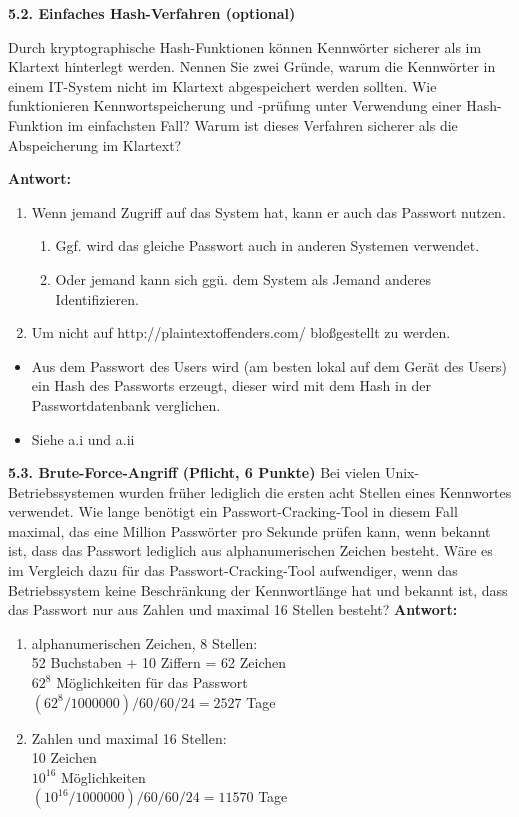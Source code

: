 \documentclass[ngerman]{fbi-aufgabenblatt}
\begin{document}
\textbf{5.2. Einfaches Hash-Verfahren (optional)}

Durch kryptographische Hash-Funktionen können Kennwörter sicherer als im Klartext hinterlegt werden. Nennen Sie zwei Gründe, warum die Kennwörter in einem IT-System nicht im Klartext abgespeichert werden sollten. Wie funktionieren Kennwortspeicherung und -prüfung unter Verwendung einer Hash-Funktion im einfachsten Fall? Warum ist dieses Verfahren sicherer als die Abspeicherung im Klartext?

\textbf{Antwort:}
   \begin{enumerate}
    \item Wenn jemand Zugriff auf das System hat, kann er auch das Passwort nutzen. 
    \begin{enumerate}
    \item Ggf. wird das gleiche Passwort auch in anderen Systemen verwendet.
    \item Oder jemand kann sich ggü. dem System als Jemand anderes Identifizieren.
    \end{enumerate}
    \item Um nicht auf http://plaintextoffenders.com/ bloßgestellt zu werden.
    \end{enumerate} 
    
    \begin{itemize}
    \item Aus dem Passwort des Users wird (am besten lokal auf dem Gerät des Users) ein Hash des Passworts erzeugt, dieser wird mit dem Hash in der Passwortdatenbank verglichen.
    \item Siehe a.i und a.ii
    \end{itemize}

\textbf{5.3. Brute-Force-Angriff (Pflicht, 6 Punkte)}
Bei vielen Unix-Betriebssystemen wurden früher lediglich die ersten acht Stellen eines Kennwortes verwendet. Wie lange benötigt ein Passwort-Cracking-Tool in diesem Fall maximal, das eine Million Passwörter pro Sekunde prüfen kann, wenn bekannt ist, dass das Passwort lediglich aus alphanumerischen Zeichen besteht. Wäre es im Vergleich dazu für das Passwort-Cracking-Tool aufwendiger, wenn das Betriebssystem keine Beschränkung der Kennwortlänge hat und bekannt ist, dass das Passwort nur aus Zahlen und maximal 16 Stellen besteht?
\textbf{Antwort:}
\begin{enumerate}
\item alphanumerischen Zeichen, 8 Stellen:\\
       52 Buchstaben + 10 Ziffern = 62 Zeichen\\
       $62^{8}$ Möglichkeiten für das Passwort\\
       $(62^{8}/1000000)/60/60/24 = 2527$ Tage\\
\item Zahlen und maximal 16 Stellen:\\
       10 Zeichen\\
       $10^{16}$ Möglichkeiten\\
       $(10^{16}/1000000)/60/60/24 = 11570$ Tage\\
\end{enumerate}
 
\end{document}
